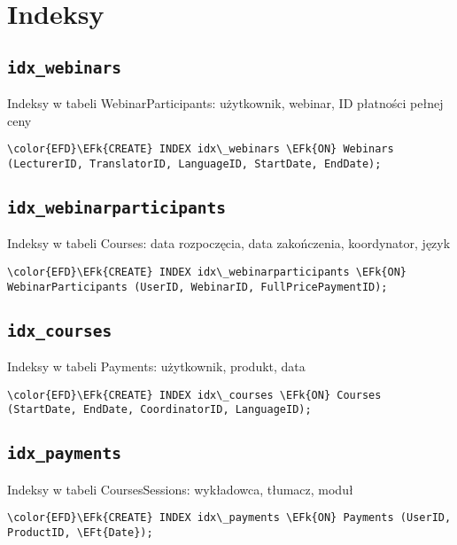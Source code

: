 \documentclass[11pt]{article}
\newcommand{\EFk}[1]{\textcolor{EFk}{\textbf{#1}}} %
\newcommand{\EFt}[1]{\textcolor{EFt}{\textbf{#1}}} %
\begin{document}
\section{Indeksy}
\label{sec:orgf2ca4e4}
\subsection{\texttt{idx\_webinars}}
\label{sec:orgfa947a8}
Indeksy w tabeli WebinarParticipants: użytkownik, webinar, ID płatności pełnej ceny
\begin{Code}
\begin{Verbatim}
\color{EFD}\EFk{CREATE} INDEX idx\_webinars \EFk{ON} Webinars (LecturerID, TranslatorID, LanguageID, StartDate, EndDate);
\end{Verbatim}
\end{Code}
\subsection{\texttt{idx\_webinarparticipants}}
\label{sec:orgdc32191}
Indeksy w tabeli Courses: data rozpoczęcia, data zakończenia, koordynator, język
\begin{Code}
\begin{Verbatim}
\color{EFD}\EFk{CREATE} INDEX idx\_webinarparticipants \EFk{ON} WebinarParticipants (UserID, WebinarID, FullPricePaymentID);
\end{Verbatim}
\end{Code}
\subsection{\texttt{idx\_courses}}
\label{sec:org6cacf8b}
Indeksy w tabeli Payments: użytkownik, produkt, data
\begin{Code}
\begin{Verbatim}
\color{EFD}\EFk{CREATE} INDEX idx\_courses \EFk{ON} Courses (StartDate, EndDate, CoordinatorID, LanguageID);
\end{Verbatim}
\end{Code}
\subsection{\texttt{idx\_payments}}
\label{sec:org861eaeb}
Indeksy w tabeli CoursesSessions: wykładowca, tłumacz, moduł
\begin{Code}
\begin{Verbatim}
\color{EFD}\EFk{CREATE} INDEX idx\_payments \EFk{ON} Payments (UserID, ProductID, \EFt{Date});
\end{Verbatim}
\end{Code}
\end{document}
